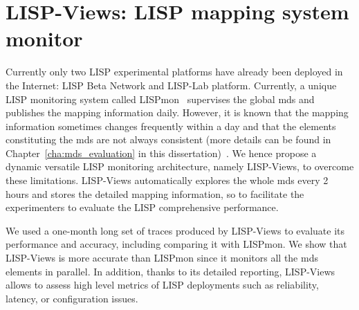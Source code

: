 
\chapter{LISP-Views: LISP mapping system monitor}
\label{cha:LISPViews}

\ifpdf
    \graphicspath{{Chapter5/Pics/Raster/}{Chapter5/Pics/PDF/}{Chapter5/}}
\else
    \graphicspath{{Chapter5/Pics/Vector/}{Chapter5/}}
\fi

Currently only two LISP experimental platforms have already been deployed in the Internet: LISP Beta Network and LISP-Lab platform. %
Currently, a unique LISP monitoring system called LISPmon~\cite{lispmon} supervises the global \acrshort{mds} and publishes the mapping information daily. However, it is known that the mapping information sometimes changes frequently within a day and that the elements constituting the \acrshort{mds} are not always consistent (more details can be found in Chapter~\ref{cha:mds_evaluation} in this dissertation)~\cite{yue2016stability}. We hence propose a dynamic versatile LISP monitoring architecture, namely LISP-Views, to overcome these limitations. LISP-Views automatically explores the whole \acrshort{mds} every 2 hours and stores the detailed mapping information, so to facilitate the experimenters to evaluate the LISP comprehensive performance.

We used a one-month long set of traces produced by LISP-Views to evaluate its performance and accuracy, including comparing it with LISPmon. We show that LISP-Views is more accurate than LISPmon since it monitors all the \acrshort{mds} elements in parallel. In addition, thanks to its detailed reporting, LISP-Views allows to assess high level metrics of LISP deployments such as reliability, latency, or configuration
issues.

